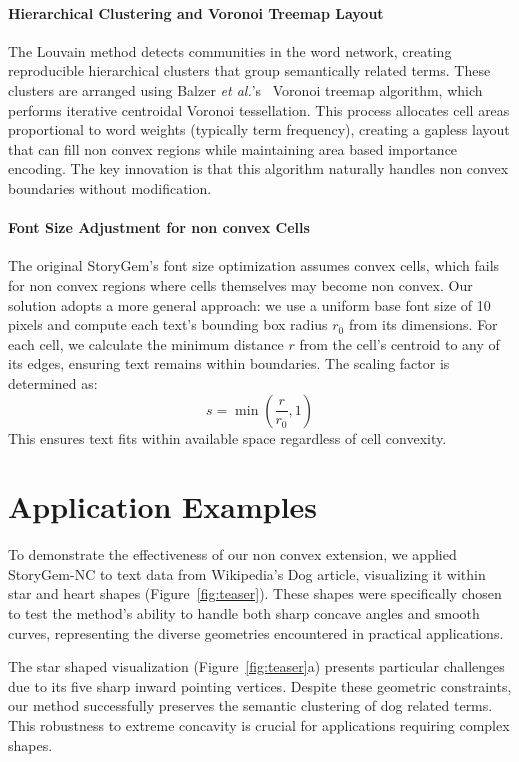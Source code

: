 \documentclass{vgtc}                          %
\newcommand{\etal}{\textit{et al.}}
\begin{document}
\paragraph{Hierarchical Clustering and Voronoi Treemap Layout}
The Louvain method detects communities in the word network, creating reproducible hierarchical clusters that group semantically related terms.
These clusters are arranged using Balzer \etal's~\cite{balzer2005voronoi} Voronoi treemap algorithm, which performs iterative centroidal Voronoi tessellation.
This process allocates cell areas proportional to word weights (typically term frequency), creating a gapless layout that can fill non convex regions while maintaining area based importance encoding.
The key innovation is that this algorithm naturally handles non convex boundaries without modification.

\paragraph{Font Size Adjustment for non convex Cells}
The original StoryGem's font size optimization assumes convex cells, which fails for non convex regions where cells themselves may become non convex.
Our solution adopts a more general approach: we use a uniform base font size of 10 pixels and compute each text's bounding box radius $r_0$ from its dimensions.
For each cell, we calculate the minimum distance $r$ from the cell's centroid to any of its edges, ensuring text remains within boundaries.
The scaling factor is determined as:
\[
  s = \min\left(\frac{r}{r_0}, 1\right)
\]
This ensures text fits within available space regardless of cell convexity.


\section{Application Examples}

To demonstrate the effectiveness of our non convex extension, we applied StoryGem-NC to text data from Wikipedia's Dog article, visualizing it within star and heart shapes (Figure~\ref{fig:teaser}).
These shapes were specifically chosen to test the method's ability to handle both sharp concave angles and smooth curves, representing the diverse geometries encountered in practical applications.

The star shaped visualization (Figure~\ref{fig:teaser}a) presents particular challenges due to its five sharp inward pointing vertices.
Despite these geometric constraints, our method successfully preserves the semantic clustering of dog related terms.
This robustness to extreme concavity is crucial for applications requiring complex shapes.
\end{document}
